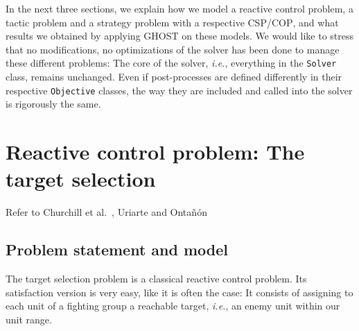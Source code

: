 \documentclass[journal]{IEEEtran}
\newcommand{\csp}{\textsc{CSP}\xspace}
\newcommand{\cop}{\textsc{COP}\xspace}
\newcommand{\ghost}{\textsc{GHOST}\xspace}
\newcommand{\ie}{\textit{i.e.}}
\begin{document}
In the next three sections, we explain how we model a reactive control
problem, a  tactic problem  and a strategy  problem with  a respective
\csp/\cop, and  what results we  obtained by applying \ghost  on these
models.   We   would  like  to   stress  that  no   modifications,  no
optimizations of  the solver has  been done to manage  these different
problems:   The  core   of  the   solver,  \ie,   everything  in   the
\texttt{Solver} class, remains unchanged.   Even if post-processes are
defined  differently in  their respective  \texttt{Objective} classes,
the way they are included and called into the solver is rigorously the
same.


\section{Reactive control problem: The target selection}\label{sec:target}

Refer to Churchill  et al.~\cite{ChurchillSB12, ChurchillB12}, Uriarte
and Onta{\~n}{\'o}n~\cite{UriarteO12}

\subsection{Problem statement and model}

The  target   selection  problem  is  a   classical  reactive  control
problem. Its satisfaction  version is very easy, like it  is often the
case: It  consists of  assigning to  each unit of  a fighting  group a
reachable target, \ie, an enemy unit within our unit range.
\end{document}
